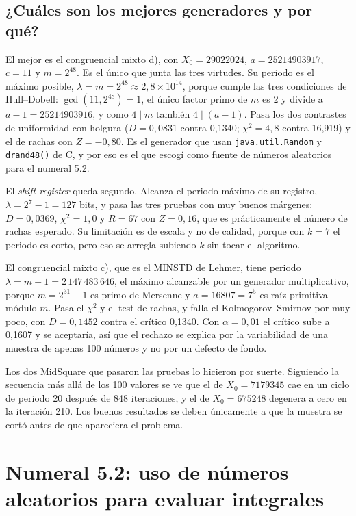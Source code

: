 \documentclass[11pt,letterpaper]{article}
\begin{document}
\subsection{¿Cuáles son los mejores generadores y por qué?}

El mejor es el congruencial mixto d), con $X_0 = 29022024$, $a = 25214903917$, $c = 11$ y
$m = 2^{48}$. Es el único que junta las tres virtudes. Su periodo es el máximo posible,
$\lambda = m = 2^{48} \approx 2{,}8 \times 10^{14}$, porque cumple las tres condiciones de
Hull--Dobell: $\gcd(11, 2^{48}) = 1$, el único factor primo de $m$ es 2 y divide a $a-1 = 25214903916$,
y como $4 \mid m$ también $4 \mid (a-1)$. Pasa los dos contrastes de uniformidad con holgura
($D = 0{,}0831$ contra 0,1340; $\chi^2 = 4{,}8$ contra 16,919) y el de rachas con $Z = -0{,}80$. Es
el generador que usan \texttt{java.util.Random} y \texttt{drand48()} de C, y por eso es el que escogí
como fuente de números aleatorios para el numeral 5.2.

El \emph{shift-register} queda segundo. Alcanza el periodo máximo de su registro,
$\lambda = 2^7 - 1 = 127$ bits, y pasa las tres pruebas con muy buenos márgenes: $D = 0{,}0369$,
$\chi^2 = 1{,}0$ y $R = 67$ con $Z = 0{,}16$, que es prácticamente el número de rachas esperado. Su
limitación es de escala y no de calidad, porque con $k = 7$ el periodo es corto, pero eso se arregla
subiendo $k$ sin tocar el algoritmo.

El congruencial mixto c), que es el MINSTD de Lehmer, tiene periodo $\lambda = m - 1 = 2\,147\,483\,646$,
el máximo alcanzable por un generador multiplicativo, porque $m = 2^{31}-1$ es primo de Mersenne y
$a = 16807 = 7^5$ es raíz primitiva módulo $m$. Pasa el $\chi^2$ y el test de rachas, y falla el
Kolmogorov--Smirnov por muy poco, con $D = 0{,}1452$ contra el crítico 0,1340. Con
$\alpha = 0{,}01$ el crítico sube a 0,1607 y se aceptaría, así que el rechazo se explica por la
variabilidad de una muestra de apenas 100 números y no por un defecto de fondo.

Los dos MidSquare que pasaron las pruebas lo hicieron por suerte. Siguiendo la secuencia más allá de
los 100 valores se ve que el de $X_0 = 7179345$ cae en un ciclo de periodo 20 después de 848
iteraciones, y el de $X_0 = 675248$ degenera a cero en la iteración 210. Los buenos resultados se
deben únicamente a que la muestra se cortó antes de que apareciera el problema.

\section{Numeral 5.2: uso de números aleatorios para evaluar integrales}
\end{document}
